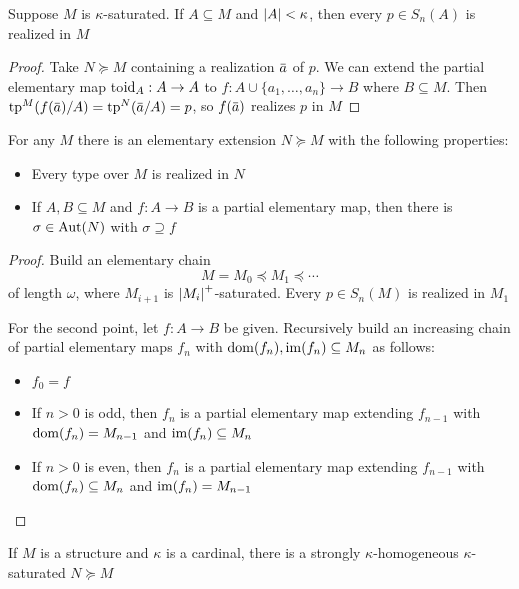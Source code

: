 \documentclass[11pt]{article}
\begin{document}
\begin{theorem}[]
Suppose \(M\) is \(\kappa\)-saturated. If \(A\subseteq M\) and \(\abs{A}<\kappa\), then every \(p\in S_n(A)\) is
realized in \(M\)
\end{theorem}

\begin{proof}
Take \(N\succeq M\) containing a realization \(\bara\) of \(p\). We can extend the partial elementary
map to\(\operatorname{id}_A:A\to A\) to \(f:A\cup\{a_1,\dots,a_n\}\to B\) where \(B\subseteq M\). Then
\(\tp^M(f(\bara)/A)=\tp^N(\bara/A)=p\), so \(f(\bara)\) realizes \(p\) in \(M\)
\end{proof}

\begin{lemma}[]
For any \(M\) there is an elementary extension \(N\succeq M\) with the following properties:
\begin{itemize}
\item Every type over \(M\) is realized in \(N\)
\item If \(A,B\subseteq M\) and \(f:A\to B\) is a partial elementary map, then there is \(\sigma\in\operatorname{\text{Aut}}(N)\)
with \(\sigma\supseteq f\)
\end{itemize}
\end{lemma}

\begin{proof}
Build an elementary chain
\begin{equation*}
M=M_0\preceq M_1\preceq\cdots
\end{equation*}
of length \(\omega\), where \(M_{i+1}\) is \(\abs{M_i}^+\)-saturated. Every \(p\in S_n(M)\) is realized
in \(M_1\)

For the second point, let \(f:A\to B\) be given. Recursively build an increasing chain of partial
elementary maps \(f_n\) with \(\operatorname{dom}(f_n),\operatorname{im}(f_n)\subseteq M_n\) as follows:
\begin{itemize}
\item \(f_0=f\)
\item If \(n>0\) is odd, then \(f_n\) is a partial elementary map extending \(f_{n-1}\)
with \(\operatorname{dom}(f_n)=M_{n-1}\) and \(\operatorname{im}(f_n)\subseteq M_n\)
\item If \(n>0\) is even, then \(f_n\) is a partial elementary map extending \(f_{n-1}\)
with \(\operatorname{dom}(f_n)\subseteq M_n\) and \(\operatorname{im}(f_n)=M_{n-1}\)
\end{itemize}
\end{proof}

\begin{theorem}[]
If \(M\) is a structure and \(\kappa\) is a cardinal, there is a strongly \(\kappa\)-homogeneous
\(\kappa\)-saturated \(N\succeq M\)
\end{theorem}
\end{document}
